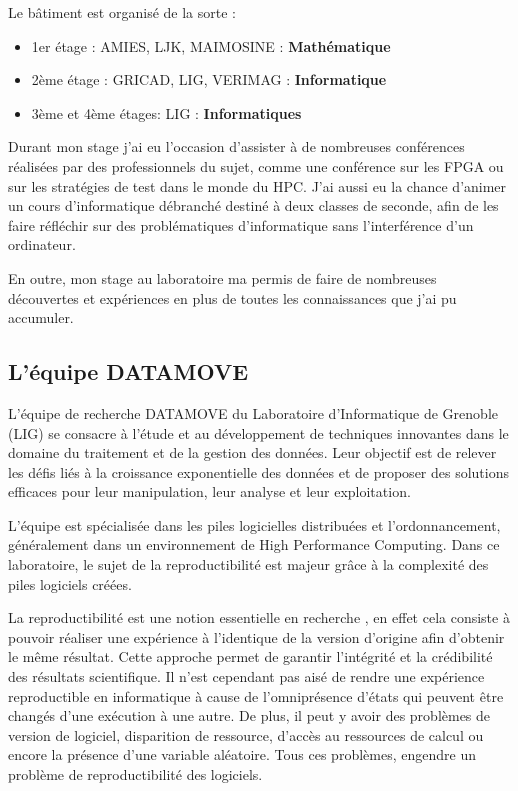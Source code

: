 \documentclass[a4paper,french,12pt, titlepage]{article}
\begin{document}
Le bâtiment est organisé de la sorte :

\begin{itemize}
\item
  1er étage : AMIES, LJK, MAIMOSINE : \textbf{Mathématique}
\item
  2ème étage : GRICAD, LIG, VERIMAG : \textbf{Informatique}
\item
  3ème et 4ème étages: LIG : \textbf{Informatiques}\newline
\end{itemize}

Durant mon stage j'ai eu l'occasion d'assister à de nombreuses
conférences réalisées par des professionnels du sujet, comme une
conférence sur les FPGA ou sur les stratégies de test dans le monde du
HPC. J'ai aussi eu la chance d'animer un cours d'informatique débranché
destiné à deux classes de seconde, afin de les faire réfléchir sur des
problématiques d'informatique sans l'interférence d'un
ordinateur.\newline

En outre, mon stage au laboratoire ma permis de faire de nombreuses
découvertes et expériences en plus de toutes les connaissances que j'ai
pu accumuler.

\hypertarget{luxe9quipe-datamove}{%
\subsection{L'équipe DATAMOVE}\label{luxe9quipe-datamove}}

L'équipe de recherche DATAMOVE du Laboratoire d'Informatique de Grenoble
(LIG) se consacre à l'étude et au développement de techniques innovantes
dans le domaine du traitement et de la gestion des données. Leur
objectif est de relever les défis liés à la croissance exponentielle des
données et de proposer des solutions efficaces pour leur manipulation,
leur analyse et leur exploitation.\newline

L'équipe est spécialisée dans les piles logicielles distribuées et
l'ordonnancement, généralement dans un environnement de High Performance
Computing. Dans ce laboratoire, le sujet de la \gls{reproductibilité}
est majeur grâce à la complexité des piles logiciels créées.\newline

La reproductibilité est une notion essentielle en recherche
\cite{reproductibility2017}, en effet cela consiste à pouvoir réaliser
une expérience à l'identique de la version d'origine afin d'obtenir le
même résultat. Cette approche permet de garantir l'intégrité et la
crédibilité des résultats scientifique. Il n'est cependant pas aisé de
rendre une expérience reproductible en informatique à cause de
l'omniprésence d'états qui peuvent être changés d'une exécution à une
autre. De plus, il peut y avoir des problèmes de version de logiciel,
disparition de ressource, d'accès au ressources de calcul ou encore la
présence d'une variable aléatoire. Tous ces problèmes, engendre un
problème de reproductibilité des logiciels.\newline
\end{document}
